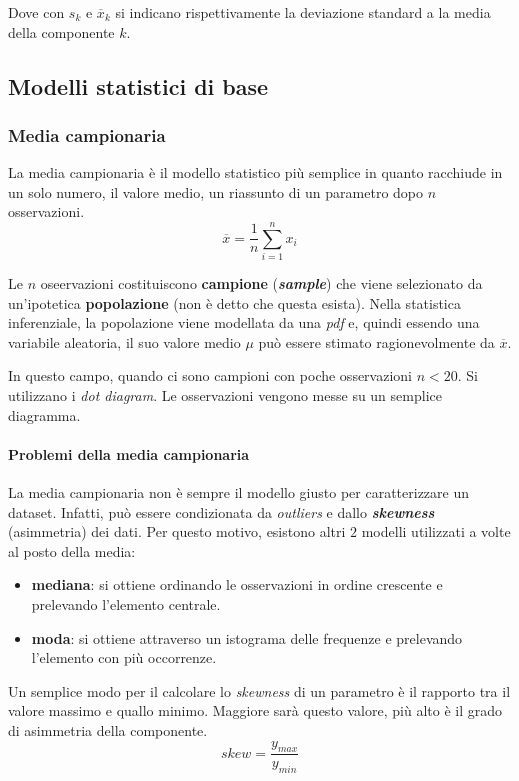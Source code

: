 \documentclass{article}
\begin{document}
Dove con $s_k$ e $\overline{x}_k$ si indicano rispettivamente la deviazione standard a la 
media della componente $k$.

\subsection{Modelli statistici di base}
\subsubsection{Media campionaria}
La media campionaria è il modello statistico più semplice in quanto racchiude in un solo 
numero, il valore medio, un riassunto di un parametro dopo $n$ osservazioni. 
$$\overline{x} = \frac{1}{n}\displaystyle\sum_{i=1}^{n}x_i$$

Le $n$ oseervazioni costituiscono \textbf{campione} (\textbf{\textit{sample}}) che viene 
selezionato da un'ipotetica \textbf{popolazione} (non è detto che questa esista). Nella 
statistica inferenziale, la popolazione viene modellata da una \textit{pdf} e, quindi
essendo una variabile aleatoria, il suo valore medio $\mu$ può essere stimato 
ragionevolmente da $\overline{x}$.

In questo campo, quando ci sono campioni con poche osservazioni $n < 20$. Si utilizzano i
\textit{dot diagram}. Le osservazioni vengono messe su un semplice diagramma.

\paragraph{Problemi della media campionaria}
La media campionaria non è sempre il modello giusto per caratterizzare un dataset. Infatti,
può essere condizionata da \textit{outliers} e dallo \textbf{\textit{skewness}} (asimmetria)
dei dati. Per questo motivo, esistono altri $2$ modelli utilizzati a volte al posto della 
media:
\begin{itemize}
  \item \textbf{mediana}: si ottiene ordinando le osservazioni in ordine crescente e
    prelevando l'elemento centrale.
  \item \textbf{moda}: si ottiene attraverso un istograma delle frequenze e 
    prelevando l'elemento con più occorrenze.
\end{itemize}

Un semplice modo per il calcolare lo \textit{skewness} di un parametro è il rapporto tra 
il valore massimo e quallo minimo. Maggiore sarà questo valore, più alto è il grado di 
asimmetria della componente. $$ skew = \frac{y_{max}}{y_{min}}$$
\end{document}
